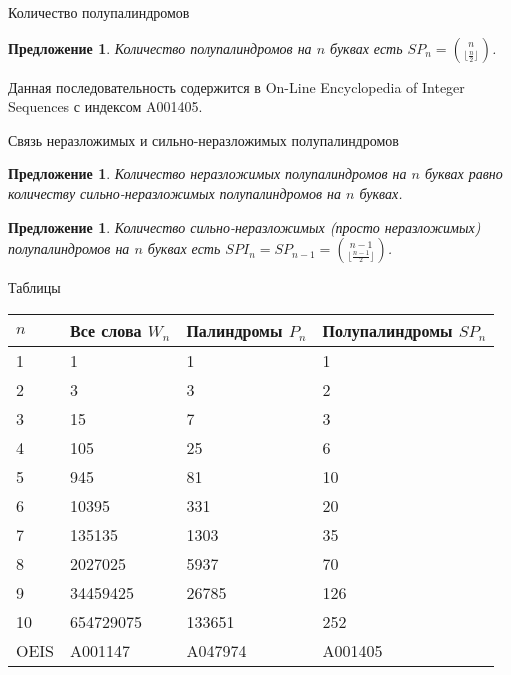 \documentclass[14pt, aspectratio=169, notheorems]{beamer}
\theoremstyle{plain}
\newtheorem{proposition}[theorem]{Предложение}
\theoremstyle{definition}
\theoremstyle{remark}
\begin{document}
\begin{frame}{Количество полупалиндромов}
    \begin{proposition}
    Количество полупалиндромов на $n$ буквах есть $SP_n = \binom{n}{\lfloor \frac{n}{2} \rfloor}$.
    \end{proposition}

    Данная последовательность содержится в On-Line Encyclopedia of Integer Sequences с индексом A001405. 
\end{frame}

\begin{frame}{Связь неразложимых и сильно-неразложимых полупалиндромов}
    \begin{proposition}
    Количество неразложимых полупалиндромов на $n$ буквах равно количеству сильно-неразложимых полупалиндромов на $n$ буквах.
    \end{proposition}
    \begin{proposition}
    Количество сильно-неразложимых (просто неразложимых) полупалиндромов на $n$ буквах есть $SPI_n = SP_{n-1} = \binom{n-1}{\lfloor \frac{n-1}{2} \rfloor}$.
\end{proposition}
\end{frame}

\begin{frame}{Таблицы}
   \centering
    \begin{tabular}{|l|l|l|l|}
\hline
$n$ & Все слова $W_n$ & Палиндромы $P_n$ & Полупалиндромы $SP_n$ \\
\hline
1 & 1 & 1 & 1 \\
2 & 3 & 3 & 2 \\
3 & 15 & 7 & 3 \\
4 & 105 & 25 & 6 \\
5 & 945 & 81 & 10 \\
6 & 10395 & 331 & 20 \\
7 & 135135 & 1303 & 35 \\
8 & 2027025 & 5937 & 70 \\
9 & 34459425 & 26785 & 126 \\
10 & 654729075 & 133651 & 252 \\
\hline
OEIS & A001147 & A047974 & A001405 \\
\hline
    \end{tabular}
\end{frame}
\end{document}
